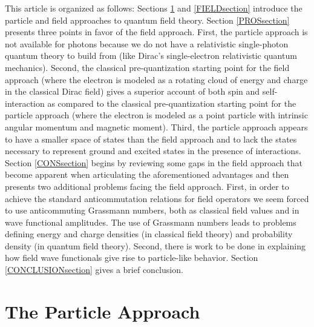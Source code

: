 \documentclass[onecolumn,secnumarabic,amsmath,amssymb,balancelastpage,nofootinbib,12pt]{article}
\begin{document}
This article is organized as follows:  Sections \ref{PARTICLEsection} and \ref{FIELDsection} introduce the particle and field approaches to quantum field theory.  Section \ref{PROSsection} presents three points in favor of the field approach.  First, the particle approach is not available for photons because we do not have a relativistic single-photon quantum theory to build from (like Dirac's single-electron relativistic quantum mechanics).  Second, the classical pre-quantization starting point for the field approach (where the electron is modeled as a rotating cloud of energy and charge in the classical Dirac field) gives a superior account of both spin and self-interaction as compared to the classical pre-quantization starting point for the particle approach (where the electron is modeled as a point particle with intrinsic angular momentum and magnetic moment).  Third, the particle approach appears to have a smaller space of states than the field approach and to lack the states necessary to represent ground and excited states in the presence of interactions.  Section \ref{CONSsection} begins by reviewing some gaps in the field approach that become apparent when articulating the aforementioned advantages and then presents two additional problems facing the field approach.  First, in order to achieve the standard anticommutation relations for field operators we seem forced to use anticommuting Grassmann numbers, both as classical field values and in wave functional amplitudes.  The use of Grassmann numbers leads to problems defining energy and charge densities (in classical field theory) and probability density (in quantum field theory).  Second, there is work to be done in explaining how field wave functionals give rise to particle-like behavior. Section \ref{CONCLUSIONsection} gives a brief conclusion.





\section{The Particle Approach}\label{PARTICLEsection}
\end{document}
